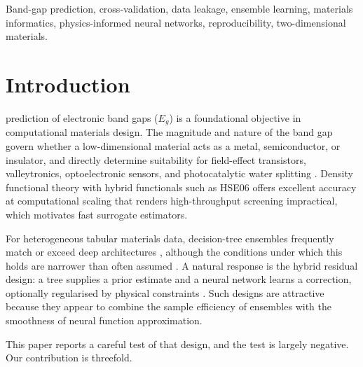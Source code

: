 \documentclass[journal]{IEEEtran}
\begin{document}
\begin{IEEEkeywords}
Band-gap prediction, cross-validation, data leakage, ensemble learning,
materials informatics, physics-informed neural networks, reproducibility,
two-dimensional materials.
\end{IEEEkeywords}

\section{Introduction}
 prediction of electronic band gaps ($E_g$) is a
foundational objective in computational materials design. The magnitude and
nature of the band gap govern whether a low-dimensional material acts as a
metal, semiconductor, or insulator, and directly determine suitability for
field-effect transistors, valleytronics, optoelectronic sensors, and
photocatalytic water splitting \cite{raissi2019physics}. Density functional
theory with hybrid functionals such as HSE06 offers excellent accuracy at
computational scaling that renders high-throughput screening impractical, which
motivates fast surrogate estimators.

For heterogeneous tabular materials data, decision-tree ensembles frequently
match or exceed deep architectures \cite{breiman2001random, friedman2001greedy,
shwartzziv2022tabular}, although the conditions under which this holds are
narrower than often assumed \cite{mcelfresh2023when}. A natural response is the
hybrid residual design: a tree supplies a prior estimate and a neural network
learns a correction, optionally regularised by physical constraints
\cite{raissi2019physics}. Such designs are attractive because they appear to
combine the sample efficiency of ensembles with the smoothness of neural
function approximation.

This paper reports a careful test of that design, and the test is largely
negative. Our contribution is threefold.
\end{document}
